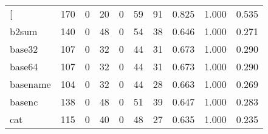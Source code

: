 \begin{longtable}{lp{2.0cm}p{2.0cm}p{2.0cm}p{2.0cm}p{2.0cm}p{2.0cm}p{2.0cm}p{2.0cm}p{2.0cm}}
\bottomrule
\endlastfoot
{[}         &                    170 &                                  0 &                                20 &                                0 &                                59 &                              91 &                                0.825 &                                  1.000 &                                0.535 \\
b2sum     &                    140 &                                  0 &                                48 &                                0 &                                54 &                              38 &                                0.646 &                                  1.000 &                                0.271 \\
base32    &                    107 &                                  0 &                                32 &                                0 &                                44 &                              31 &                                0.673 &                                  1.000 &                                0.290 \\
base64    &                    107 &                                  0 &                                32 &                                0 &                                44 &                              31 &                                0.673 &                                  1.000 &                                0.290 \\
basename  &                    104 &                                  0 &                                32 &                                0 &                                44 &                              28 &                                0.663 &                                  1.000 &                                0.269 \\
basenc    &                    138 &                                  0 &                                48 &                                0 &                                51 &                              39 &                                0.647 &                                  1.000 &                                0.283 \\
cat       &                    115 &                                  0 &                                40 &                                0 &                                48 &                              27 &                                0.635 &                                  1.000 &                                0.235 \\

\end{longtable}

